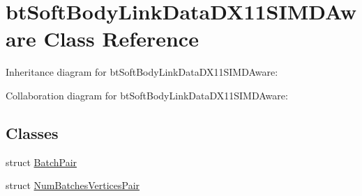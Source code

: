 \hypertarget{classbt_soft_body_link_data_d_x11_s_i_m_d_aware}{\section{bt\+Soft\+Body\+Link\+Data\+D\+X11\+S\+I\+M\+D\+Aware Class Reference}
\label{classbt_soft_body_link_data_d_x11_s_i_m_d_aware}
}


Inheritance diagram for bt\+Soft\+Body\+Link\+Data\+D\+X11\+S\+I\+M\+D\+Aware\+:


Collaboration diagram for bt\+Soft\+Body\+Link\+Data\+D\+X11\+S\+I\+M\+D\+Aware\+:
\subsection*{Classes}
\begin{DoxyCompactItemize}
\item 
struct \hyperlink{structbt_soft_body_link_data_d_x11_s_i_m_d_aware_1_1_batch_pair}{Batch\+Pair}
\item 
struct \hyperlink{structbt_soft_body_link_data_d_x11_s_i_m_d_aware_1_1_num_batches_vertices_pair}{Num\+Batches\+Vertices\+Pair}
\end{DoxyCompactItemize}
